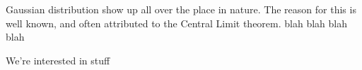 Gaussian distribution show up all over the place in nature.
The reason for this is well known,
and often attributed to the Central Limit theorem. blah blah blah blah
\cite{clt} \cite{clt2}

We're interested in stuff

